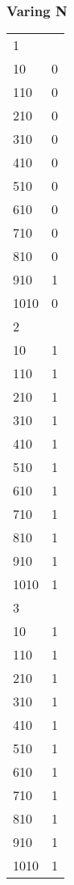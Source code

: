 \documentclass{article}
\begin{document}
\subsubsection{Varing N}
\begin{table}[]
\begin{tabular}{ll}
1    &   \\
10   & 0 \\
110  & 0 \\
210  & 0 \\
310  & 0 \\
410  & 0 \\
510  & 0 \\
610  & 0 \\
710  & 0 \\
810  & 0 \\
910  & 1 \\
1010 & 0 \\
2    &   \\
10   & 1 \\
110  & 1 \\
210  & 1 \\
310  & 1 \\
410  & 1 \\
510  & 1 \\
610  & 1 \\
710  & 1 \\
810  & 1 \\
910  & 1 \\
1010 & 1 \\
3    &   \\
10   & 1 \\
110  & 1 \\
210  & 1 \\
310  & 1 \\
410  & 1 \\
510  & 1 \\
610  & 1 \\
710  & 1 \\
810  & 1 \\
910  & 1 \\
1010 & 1
\end{tabular}
\end{table}
\end{document}
